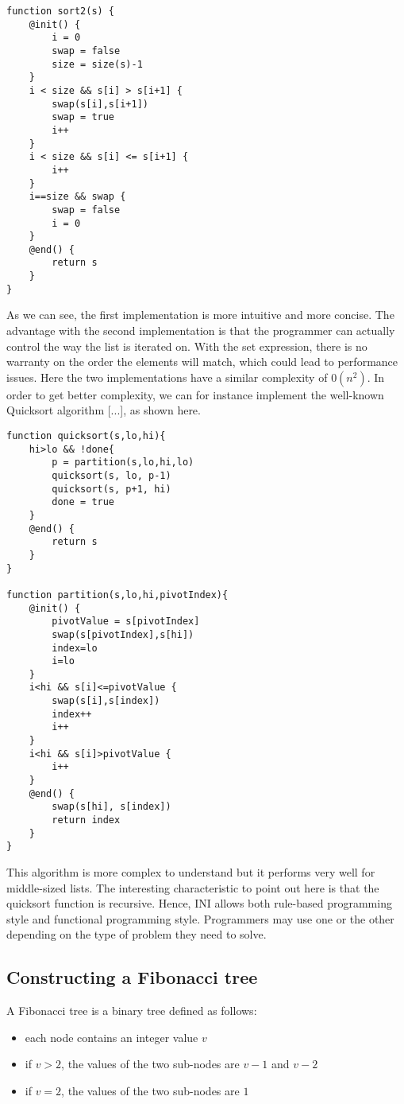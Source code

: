 \documentclass[11pt]{article}
\begin{document}
\begin{lstlisting}
function sort2(s) {
	@init() {
		i = 0
		swap = false
		size = size(s)-1
	}
	i < size && s[i] > s[i+1] {
		swap(s[i],s[i+1])
		swap = true
		i++
	}
	i < size && s[i] <= s[i+1] {
		i++
	}
	i==size && swap {
		swap = false
		i = 0
	}
	@end() {
		return s
	}
}
\end{lstlisting}

As we can see, the first implementation is more intuitive and more concise. The advantage with the second implementation is that the programmer can actually control the way the list is iterated on. With the set expression, there is no warranty on the order the elements will match, which could lead to performance issues. Here the two implementations have a similar complexity of $0(n^2)$. In order to get better complexity, we can for instance implement the well-known Quicksort algorithm [...], as shown here.


\begin{lstlisting}
function quicksort(s,lo,hi){
	hi>lo && !done{
		p = partition(s,lo,hi,lo)
		quicksort(s, lo, p-1)
		quicksort(s, p+1, hi)
		done = true
	}
	@end() {
		return s
	}
}

function partition(s,lo,hi,pivotIndex){
	@init() {
		pivotValue = s[pivotIndex]
		swap(s[pivotIndex],s[hi])
		index=lo
		i=lo
	}
	i<hi && s[i]<=pivotValue {
		swap(s[i],s[index])
		index++
		i++
	}
	i<hi && s[i]>pivotValue {
		i++
	}
	@end() {
		swap(s[hi], s[index])
		return index
	}
}
\end{lstlisting}

This algorithm is more complex to understand but it performs very well for middle-sized lists. The interesting characteristic to point out here is that the quicksort function is recursive. Hence, INI allows both rule-based programming style and functional programming style. Programmers may use one or the other depending on the type of problem they need to solve.

\subsection{Constructing a Fibonacci tree}

A Fibonacci tree is a binary tree defined as follows:

\begin{itemize}
\item each node contains an integer value $v$
\item if $v>2$, the values of the two sub-nodes are $v-1$ and $v-2$
\item if $v=2$, the values of the two sub-nodes are $1$
\end{itemize}
\end{document}
